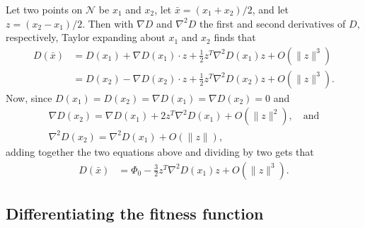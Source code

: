 \documentclass{article}
\newcommand{\grad}{\nabla}
\newcommand{\1}{\mathbbm{1}}
\newcommand{\allS}{\mathcal{N}}
\newcommand{\optph}{\Phi_0}
\begin{document}
Let two points on $\allS$ be $x_1$ and $x_2$, let $\bar x = (x_1+x_2)/2$, and let $z=(x_2 - x_1)/2$.
Then with $\grad D$ and $\grad^2 D$ the first and second derivatives of $D$, respectively,
Taylor expanding about $x_1$ and $x_2$ finds that
\begin{align*}
    D(\bar x) 
    &= D(x_1) + \grad D(x_1) \cdot z + \frac{1}{2} z^T \grad^2  D(x_1) z + O(\|z\|^3) \\
    &=  D(x_2) - \grad D(x_2) \cdot z + \frac{1}{2} z^T \grad^2  D(x_2) z + O(\|z\|^3) .
\end{align*}
Now, since $ D(x_1) =  D(x_2) = \grad D(x_1) = \grad D(x_2) = 0$ and
\begin{align*}
    \grad D(x_2) = \grad D(x_1) + 2 z^T \grad^2  D(x_1) + O(\|z\|^2), \quad \text{and} \\
    \grad^2 D(x_2) = \grad^2 D(x_1) + O(\|z\|), 
\end{align*}
adding together the two equations above and dividing by two gets that
\begin{align*}
     D(\bar x) 
    &= \optph - \frac{3}{2} z^T \grad^2  D(x_1) z + O(\|z\|^3) .
\end{align*}

\subsection{Differentiating the fitness function}
\label{apx:H_calc}
\end{document}

